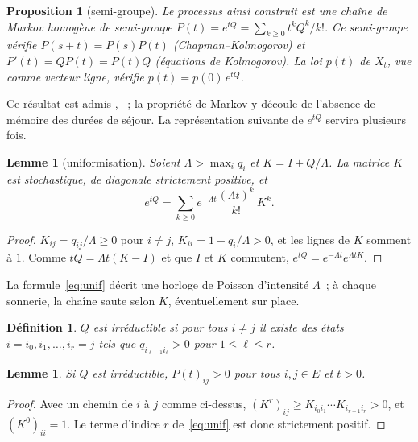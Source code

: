 \documentclass[10pt,a4paper,twocolumn]{article}
\theoremstyle{enonce}
\newtheorem{proposition}[theoreme]{Proposition}
\newtheorem{lemme}[theoreme]{Lemme}
\theoremstyle{defi}
\newtheorem{definition}[theoreme]{Définition}
\begin{document}
\begin{proposition}[semi-groupe]\label{prop:semigroupe}
Le processus ainsi construit est une chaîne de Markov homogène de semi-groupe $P(t)=e^{tQ}=\sum_{k\geq0}t^kQ^k/k!$. Ce semi-groupe vérifie $P(s+t)=P(s)P(t)$ (Chapman--Kolmogorov) et $P'(t)=QP(t)=P(t)Q$ (équations de Kolmogorov). La loi $p(t)$ de $X_t$, vue comme vecteur ligne, vérifie $p(t)=p(0)\,e^{tQ}$.
\end{proposition}

Ce résultat est admis \cite[§2.6--2.8]{Nor97}, \cite{Guy07}~; la propriété de Markov y découle de l'absence de mémoire des durées de séjour. La représentation suivante de $e^{tQ}$ servira plusieurs fois.

\begin{lemme}[uniformisation]\label{lem:unif}
Soient $\Lambda>\max_iq_i$ et $K=I+Q/\Lambda$. La matrice $K$ est stochastique, de diagonale strictement positive, et
\begin{equation}\label{eq:unif}
e^{tQ}=\sum_{k\geq0}e^{-\Lambda t}\frac{(\Lambda t)^k}{k!}\,K^k.
\end{equation}
\end{lemme}

\begin{proof}
$K_{ij}=q_{ij}/\Lambda\geq0$ pour $i\neq j$, $K_{ii}=1-q_i/\Lambda>0$, et les lignes de $K$ somment à $1$. Comme $tQ=\Lambda t(K-I)$ et que $I$ et $K$ commutent, $e^{tQ}=e^{-\Lambda t}e^{\Lambda tK}$.
\end{proof}

La formule~\eqref{eq:unif} décrit une horloge de Poisson d'intensité $\Lambda$~; à chaque sonnerie, la chaîne saute selon $K$, éventuellement sur place.

\begin{definition}
$Q$ est \emph{irréductible} si pour tous $i\neq j$ il existe des états $i=i_0,i_1,\dots,i_r=j$ tels que $q_{i_{\ell-1}i_\ell}>0$ pour $1\leq\ell\leq r$.
\end{definition}

\begin{lemme}\label{lem:positif}
Si $Q$ est irréductible, $P(t)_{ij}>0$ pour tous $i,j\in E$ et $t>0$.
\end{lemme}

\begin{proof}
Avec un chemin de $i$ à $j$ comme ci-dessus, $(K^r)_{ij}\geq K_{i_0i_1}\cdots K_{i_{r-1}i_r}>0$, et $(K^0)_{ii}=1$. Le terme d'indice $r$ de~\eqref{eq:unif} est donc strictement positif.
\end{proof}
\end{document}
